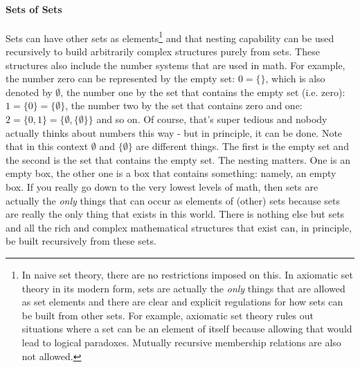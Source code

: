 \paragraph{Sets of Sets}
Sets can have other sets as elements\footnote{In naive set theory, there are no restrictions imposed on this. In axiomatic set theory in its modern form, sets are actually the \emph{only} things that are allowed as set elements and there are clear and explicit regulations for how sets can be built from other sets. For example, axiomatic set theory rules out situations where a set can be an element of itself because allowing that would lead to logical paradoxes. Mutually recursive membership relations are also not allowed.} and that nesting capability can be used recursively to build arbitrarily complex structures purely from sets. These structures also include the number systems that are used in math. For example, the number zero can be represented by the empty set: $0 = \{\}$, which is also denoted by $\emptyset$, the number one by the set that contains the empty set (i.e. zero): $1 = \{ 0 \} =  \{ \emptyset \}$, the number two by the set that contains zero and one: $2 = \{ 0, 1 \} = \{ \emptyset, \{ \emptyset \} \}$ and so on. Of course, that's super tedious and nobody actually thinks about numbers this way - but in principle, it can be done. Note that in this context $\emptyset$ and $\{ \emptyset \}$ are different things. The first is the empty set and the second is the set that contains the empty set. The nesting matters. One is an empty box, the other one is a box that contains something: namely, an empty box. If you really go down to the very lowest levels of math, then sets are actually the \emph{only} things that can occur as elements of (other) sets because sets are really the only thing that exists in this world. There is nothing else but sets and all the rich and complex mathematical structures that exist can, in principle, be built recursively from these sets. 


